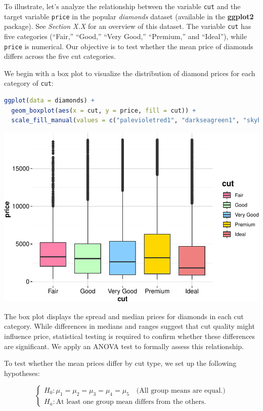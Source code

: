 \documentclass[
]{book}
\newcommand{\passthrough}[1]{#1}
\theoremstyle{definition}
\theoremstyle{definition}
\theoremstyle{definition}
\theoremstyle{definition}
\theoremstyle{remark}
\begin{document}
To illustrate, let's analyze the relationship between the variable \passthrough{\lstinline!cut!} and the target variable \passthrough{\lstinline!price!} in the popular \emph{diamonds} dataset (available in the \textbf{ggplot2} package). See \emph{Section X.X} for an overview of this dataset. The variable \passthrough{\lstinline!cut!} has five categories (``Fair,'' ``Good,'' ``Very Good,'' ``Premium,'' and ``Ideal''), while \passthrough{\lstinline!price!} is numerical. Our objective is to test whether the mean price of diamonds differs across the five cut categories.

We begin with a box plot to visualize the distribution of diamond prices for each category of \passthrough{\lstinline!cut!}:

\begin{lstlisting}[language=R]
ggplot(data = diamonds) + 
  geom_boxplot(aes(x = cut, y = price, fill = cut)) +
  scale_fill_manual(values = c("palevioletred1", "darkseagreen1", "skyblue1", "gold1", "lightcoral"))
\end{lstlisting}

\begin{center}\includegraphics[width=0.7\linewidth]{statistics_files/figure-latex/unnamed-chunk-17-1} \end{center}

The box plot displays the spread and median prices for diamonds in each cut category. While differences in medians and ranges suggest that cut quality might influence price, statistical testing is required to confirm whether these differences are significant. We apply an ANOVA test to formally assess this relationship.

To test whether the mean prices differ by cut type, we set up the following hypotheses:

\[
\begin{cases}
    H_0: \mu_1 = \mu_2 = \mu_3 = \mu_4 = \mu_5 \quad \text{(All group means are equal.)} \\
    H_a: \text{At least one group mean differs from the others.}  
\end{cases}
\]
\end{document}
